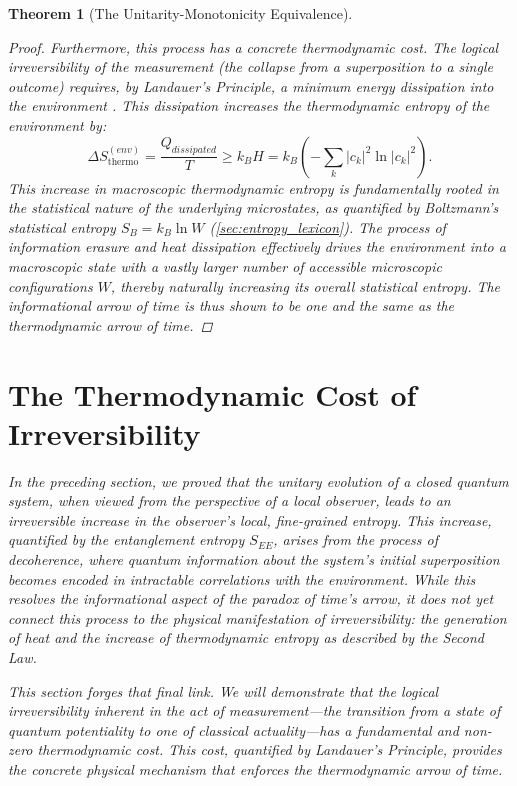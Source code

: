 \documentclass[11pt, letterpaper]{report}
\theoremstyle{plain} %
\newtheorem{theorem}{Theorem}[chapter]
\theoremstyle{definition} %
\theoremstyle{remark} %
\begin{document}
\begin{theorem}[The Unitarity-Monotonicity Equivalence]
\begin{proof}
Furthermore, this process has a concrete thermodynamic cost. The logical irreversibility of the measurement (the collapse from a superposition to a single outcome) requires, by Landauer's Principle, a minimum energy dissipation into the environment \cite{Landauer1961, Bennett1982}. This dissipation increases the thermodynamic entropy of the environment by:
\begin{equation}
        \Delta S_{\text{thermo}}^{(env)} = \frac{Q_{dissipated}}{T} \ge k_B H = k_B \left(-\sum_k |c_k|^2 \ln |c_k|^2\right).
\end{equation}
This increase in macroscopic thermodynamic entropy is fundamentally rooted in the statistical nature of the underlying microstates, as quantified by Boltzmann's statistical entropy $S_B = k_B \ln W$ (\cref{sec:entropy_lexicon}). The process of information erasure and heat dissipation effectively drives the environment into a macroscopic state with a vastly larger number of accessible microscopic configurations $W$, thereby naturally increasing its overall statistical entropy. The informational arrow of time is thus shown to be one and the same as the thermodynamic arrow of time.
\end{proof}


\section{The Thermodynamic Cost of Irreversibility}
\label{sec:thermodynamic_cost}

In the preceding section, we proved that the unitary evolution of a closed quantum system, when viewed from the perspective of a local observer, leads to an irreversible increase in the observer's local, fine-grained entropy. This increase, quantified by the entanglement entropy $S_{EE}$, arises from the process of decoherence, where quantum information about the system's initial superposition becomes encoded in intractable correlations with the environment. While this resolves the informational aspect of the paradox of time's arrow, it does not yet connect this process to the physical manifestation of irreversibility: the generation of heat and the increase of thermodynamic entropy as described by the Second Law.

This section forges that final link. We will demonstrate that the logical irreversibility inherent in the act of measurement—the transition from a state of quantum potentiality to one of classical actuality—has a fundamental and non-zero thermodynamic cost. This cost, quantified by Landauer's Principle, provides the concrete physical mechanism that enforces the thermodynamic arrow of time.


\end{theorem}
\end{document}
